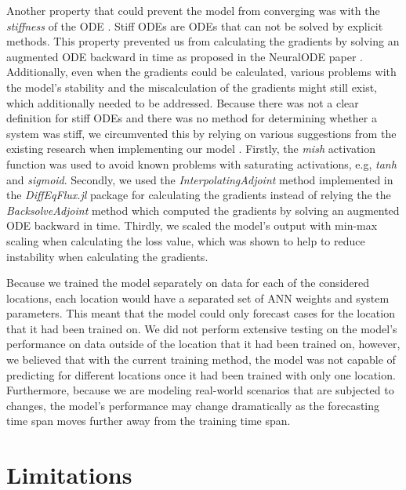 Another property that could prevent the model from converging was with the \textit{stiffness} of the \gls{ODE} \cite{kimStiffNeuralOrdinary2021}.
Stiff \glspl{ODE} are \glspl{ODE} that can not be solved by explicit methods.
This property prevented us from calculating the gradients by solving an augmented \gls{ODE} backward in time as proposed in the \gls{NeuralODE} paper \cite{chenNeuralOrdinaryDifferential2019}.
Additionally, even when the gradients could be calculated, various problems with the model's stability and the miscalculation of the gradients might still exist, which additionally needed to be addressed.
Because there was not a clear definition for stiff \glspl{ODE} and there was no method for determining whether a system was stiff, we circumvented this by relying on various suggestions from the existing research when implementing our model \cite{kimStiffNeuralOrdinary2021}.
Firstly, the \textit{mish} activation function \cite{misraMishSelfRegularized2020} was used to avoid known problems with saturating activations, e.g, \textit{tanh} and \textit{sigmoid}.
Secondly, we used the \textit{InterpolatingAdjoint} method implemented in the \textit{DiffEqFlux.jl} package for calculating the gradients instead of relying the the \textit{BacksolveAdjoint} method which computed the gradients by solving an augmented \gls{ODE} backward in time.
Thirdly, we scaled the model's output with min-max scaling when calculating the loss value, which was shown to help to reduce instability when calculating the gradients.

Because we trained the model separately on data for each of the considered locations, each location would have a separated set of \gls{ANN} weights and system parameters.
This meant that the model could only forecast cases for the location that it had been trained on.
We did not perform extensive testing on the model's performance on data outside of the location that it had been trained on, however, we believed that with the current training method, the model was not capable of predicting for different locations once it had been trained with only one location.
Furthermore, because we are modeling real-world scenarios that are subjected to changes, the model's performance may change dramatically as the forecasting time span moves further away from the training time span.

\section{Limitations}

